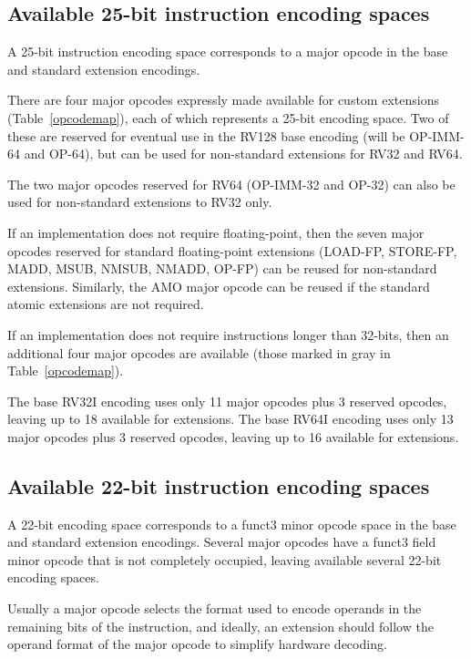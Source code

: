 \subsection*{Available 25-bit instruction encoding spaces}

A 25-bit instruction encoding space corresponds to a major opcode in
the base and standard extension encodings.

There are four major opcodes expressly made available for custom extensions
(Table~\ref{opcodemap}), each of which represents a 25-bit encoding
space.  Two of these are reserved for eventual use in the RV128 base
encoding (will be OP-IMM-64 and OP-64), but can be used for
non-standard extensions for RV32 and RV64.

The two major opcodes reserved for RV64 (OP-IMM-32 and OP-32) can also be
used for non-standard extensions to RV32 only.

If an implementation does not require floating-point, then the seven
major opcodes reserved for standard floating-point extensions
(LOAD-FP, STORE-FP, MADD, MSUB, NMSUB, NMADD, OP-FP) can be reused for
non-standard extensions.  Similarly, the AMO major opcode can be
reused if the standard atomic extensions are not required.

If an implementation does not require instructions longer than
32-bits, then an additional four major opcodes are available (those
marked in gray in Table~\ref{opcodemap}).

The base RV32I encoding uses only 11 major opcodes plus 3 reserved
opcodes, leaving up to 18 available for extensions.  The base RV64I
encoding uses only 13 major opcodes plus 3 reserved opcodes, leaving
up to 16 available for extensions.

\subsection*{Available 22-bit instruction encoding spaces}

A 22-bit encoding space corresponds to a funct3 minor opcode space in
the base and standard extension encodings.  Several major opcodes have
a funct3 field minor opcode that is not completely occupied, leaving
available several 22-bit encoding spaces.

Usually a major opcode selects the format used to encode operands in
the remaining bits of the instruction, and ideally, an extension
should follow the operand format of the major opcode to simplify
hardware decoding.

